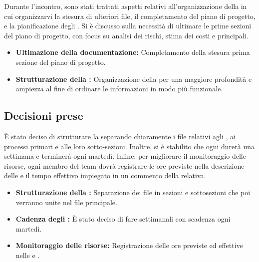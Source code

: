 \documentclass[a4paper, 12pt]{article}
\begin{document}
Durante l'incontro, sono stati trattati aspetti relativi all'organizzazione della  in cui organizzarvi la stesura di ulteriori file, il completamento del piano di progetto, e la pianificazione degli . 
Si è discusso sulla necessità di ultimare le prime sezioni del piano di progetto, con focus su analisi dei rischi, stima dei costi e  principali.

\begin{itemize}
    \item \textbf{Ultimazione della documentazione:} Completamento della stesura prima sezione del piano di progetto.
    \item \textbf{Strutturazione della :} Organizzazione della  per una maggiore profondità e ampiezza al fine di ordinare le informazioni in modo più funzionale.
\end{itemize}

\subsection{Decisioni prese}

È stato deciso di strutturare la  separando chiaramente i file relativi agli , ai processi primari e alle loro sotto-sezioni. 
Inoltre, si è stabilito che ogni  durerà una settimana e terminerà ogni martedì. Infine, per migliorare il monitoraggio delle risorse, ogni membro del team dovrà registrare le ore previste nella descrizione delle  e il tempo effettivo impiegato in un commento della  relativa.

\begin{itemize}
    \item \textbf{Strutturazione della :} Separazione dei file in sezioni e sottosezioni che poi verranno unite nel file principale.
    \item \textbf{Cadenza degli :} È stato deciso di fare  settimanali con scadenza ogni martedì.
    \item \textbf{Monitoraggio delle risorse:} Registrazione delle ore previste ed effettive nelle  e .
\end{itemize}
\end{document}

